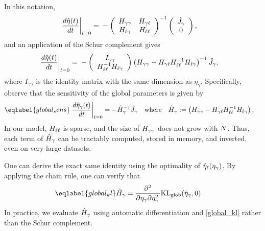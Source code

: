 In this notation,
%
\begin{align*}
%
\fracat{d \etaopt(\t)}{d \t}{t = 0} ={}&
-\left(
\begin{array}{cc}
   \hess{\gamma\gamma} & \hess{\gamma\ell} \\
   \hess{\ell\gamma}     & \hess{\ell\ell} \\
\end{array}
\right)^{-1}
\left( \begin{array}{c} \crosshessian_\gamma \\ 0 \end{array}\right),
%
\end{align*}
%
and an application of the Schur complement gives
%
\begin{align*}
%
\fracat{d \etaopt(\t)}{d \t}{t = 0} ={}&
-\left(\begin{array}{c}
I_{\gamma\gamma} \\
\hess{\ell\ell}^{-1} \hess{\ell\gamma}
\end{array}\right)
\left(\hess{\gamma\gamma} -
      \hess{\gamma\ell} \hess{\ell\ell}^{-1} \hess{\ell\gamma}\right)^{-1} \crosshessian_\gamma,
%
\end{align*}
%
where $I_{\gamma\gamma}$ is the identity matrix with
the same dimension as $\eta_\gamma$.
%
Specifically, observe that the sensitivity of the global parameters
is given by
%
\begin{align}\eqlabel{global_sens}
  \fracat{d \etaopt_\gamma(\t)}{d \t}{t = 0} &=
  - \hessopt_\gamma^{-1}\crosshessian_\gamma
  \mathwhere
  \hessopt_\gamma := \left(\hess{\gamma\gamma} -
        \hess{\gamma\ell} \hess{\ell\ell}^{-1} \hess{\ell\gamma}\right),
\end{align}
%
In our model, $H_{\ell\ell}$ is sparse, and the size of $H_{\gamma\gamma}$
does not grow with $N$. Thus, each term of $\hat{H}_\gamma$ can be tractably
computed, stored in  memory, and inverted, even on very large datasets.

One can derive the exact same identity using the optimality of
$\hat\eta_{\ell}(\eta_\gamma)$.  By applying the chain rule, one can
verify that
%
\begin{align}\eqlabel{global_kl}
\hessopt_{\gamma} &=
    \frac{\partial^2}{\partial\eta_\gamma\partial\eta_\gamma^T}
    \KLglobal(\etaopt_\gamma, 0).
\end{align}
%
In practice, we evaluate $\hat{H}_\gamma$ using automatic differentiation and
\eqref{global_kl} rather than the Schur complement.

